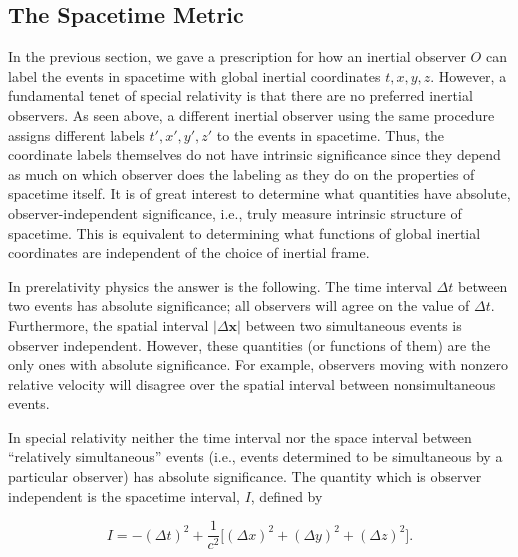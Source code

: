
\subsection{The Spacetime Metric}\label{sec:1.3}

In the previous section, we gave a prescription for how an inertial observer \(O\) can
label the events in spacetime with global inertial coordinates \(t, x, y, z\). However,
a fundamental tenet of special relativity is that there are no preferred inertial
observers. As seen above, a different inertial observer using the same procedure
assigns different labels \(t', x', y', z'\) to the events in spacetime. Thus, the
coordinate labels themselves do not have intrinsic significance since they depend as
much on which observer does the labeling as they do on the properties of spacetime
itself. It is of great interest to determine what quantities have absolute,
observer-independent significance, i.e., truly measure intrinsic structure of
spacetime. This is equivalent to determining what functions of global inertial
coordinates are independent of the choice of inertial frame.

In prerelativity physics the answer is the following. The time interval \(\Delta t\)
between two events has absolute significance; all observers will agree on the value of
\(\Delta t\). Furthermore, the spatial interval \(\lvert\Delta\mathbf{x}\rvert\) between two
simultaneous events is observer independent. However, these quantities (or functions
of them) are the only ones with absolute significance. For example, observers moving
with nonzero relative velocity will disagree over the spatial interval between
nonsimultaneous events.

In special relativity neither the time interval nor the space interval between
``relatively simultaneous'' events (i.e., events determined to be simultaneous by a
particular observer) has absolute significance. The quantity which is observer
independent is the spacetime interval, \(I\), defined by

\begin{equation}
  I = -(\Delta t)^2
      +\frac{1}{c^2}\bigl[(\Delta x)^2+(\Delta y)^2+(\Delta z)^2\bigr].
  \tag{1.3.1}\label{eq:1.3.1}
\end{equation}

